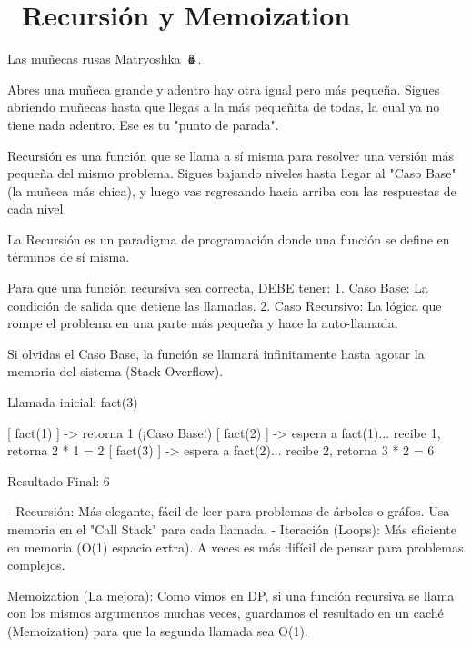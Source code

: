 ﻿\chapter[\emj{🔄}~Recursión y Memoization]{~Recursión y Memoization}

\begin{dsaquees}
Las muñecas rusas Matryoshka 🪆. 

Abres una muñeca grande y adentro hay otra igual pero más pequeña. 
Sigues abriendo muñecas hasta que llegas a la más pequeñita de todas,
la cual ya no tiene nada adentro. Ese es tu "punto de parada".

Recursión es una función que se llama a sí misma para resolver una
versión más pequeña del mismo problema. Sigues bajando niveles hasta
llegar al "Caso Base" (la muñeca más chica), y luego vas regresando 
hacia arriba con las respuestas de cada nivel.
\end{dsaquees}
\begin{dsaotraforma}
La Recursión es un paradigma de programación donde una función se
define en términos de sí misma. 

Para que una función recursiva sea correcta, DEBE tener:
1. Caso Base: La condición de salida que detiene las llamadas.
2. Caso Recursivo: La lógica que rompe el problema en una parte más
   pequeña y hace la auto-llamada.

Si olvidas el Caso Base, la función se llamará infinitamente hasta 
agotar la memoria del sistema (Stack Overflow).
\end{dsaotraforma}
\begin{dsadiagrama}
Llamada inicial: fact(3)

[ fact(1) ] -> retorna 1 (¡Caso Base!)
[ fact(2) ] -> espera a fact(1)... recibe 1, retorna 2 * 1 = 2
[ fact(3) ] -> espera a fact(2)... recibe 2, retorna 3 * 2 = 6

Resultado Final: 6
\end{dsadiagrama}
\begin{dsacomofunciona}
- Recursión: Más elegante, fácil de leer para problemas de árboles o 
  gráfos. Usa memoria en el "Call Stack" para cada llamada.
- Iteración (Loops): Más eficiente en memoria (O(1) espacio extra). 
  A veces es más difícil de pensar para problemas complejos.

Memoization (La mejora):
Como vimos en DP, si una función recursiva se llama con los mismos 
argumentos muchas veces, guardamos el resultado en un caché 
(Memoization) para que la segunda llamada sea O(1).
\end{dsacomofunciona}
